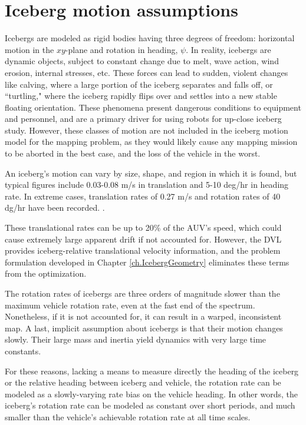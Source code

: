 \section{Iceberg motion assumptions}

Icebergs are modeled as rigid bodies having three degrees of freedom: horizontal motion in the $xy$-plane and rotation in heading, $\psi$. In reality, icebergs are dynamic objects, subject to constant change due to melt, wave action, wind erosion, internal stresses, etc. These forces can lead to sudden, violent changes like calving, where a large portion of the iceberg separates and falls off, or ``turtling," where the iceberg rapidly flips over and settles into a new stable floating orientation. These phenomena present dangerous conditions to equipment and personnel, and are a primary driver for using robots for up-close iceberg study.  However, these classes of motion are not included in the iceberg motion model for the mapping problem, as they would likely cause any mapping mission to be aborted in the best case, and the loss of the vehicle in the worst.

An iceberg's motion can vary by size, shape, and region in which it is found, but typical figures include 0.03-0.08 m/s in translation  and 5-10 deg/hr in heading rate. In extreme cases, translation rates of 0.27 m/s and rotation rates of 40 dg/hr have been recorded. \cite{Gladstone2002,Wadhams1983}. 

These translational rates can be up to 20\% of the AUV's speed, which could cause extremely large apparent drift if not accounted for. However, the DVL provides iceberg-relative translational velocity information, and the problem formulation developed in Chapter \ref{ch.IcebergGeometry} eliminates these terms from the optimization.

The rotation rates of icebergs are three orders of magnitude slower than the maximum vehicle rotation rate, even at the fast end of the spectrum. Nonetheless, if it is not accounted for, it can result in a warped, inconsistent map. A last, implicit assumption about icebergs is that their motion changes slowly. Their large mass and inertia yield dynamics with very large time constants. 

For these reasons, lacking a means to measure directly the heading of the iceberg or the relative heading between iceberg and vehicle, the rotation rate can be modeled as a slowly-varying rate bias on the vehicle heading. In other words, the iceberg's rotation rate can be modeled as constant over short periods, and much smaller than the vehicle's achievable rotation rate at all time scales.

